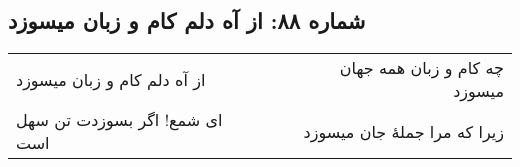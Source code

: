 \begin{center}
\section*{شماره ۸۸: از آه دلم کام و زبان میسوزد}
\label{sec:088}
\begin{longtable}{l p{0.5cm} r}
از آه دلم کام و زبان میسوزد
&&
چه کام و زبان همه جهان میسوزد
\\
ای شمع! اگر بسوزدت تن سهل است
&&
زیرا که مرا جملهٔ جان میسوزد
\\
\end{longtable}
\end{center}
